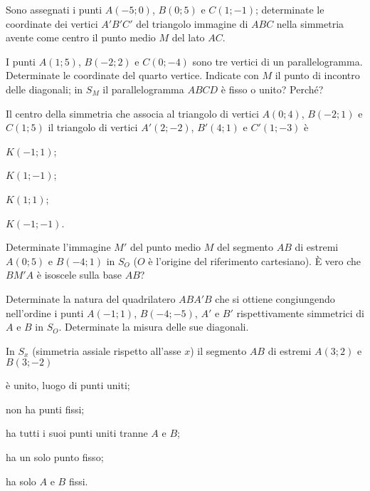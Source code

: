 \begin{esercizio}
  \label{ese:8.9}
  Sono assegnati i punti $A(-5;0)$, $B(0;5)$ e $C(1;-1)$; determinate 
  le coordinate dei vertici $A'B'C'$ del triangolo immagine di $ABC$ 
  nella simmetria avente come centro il punto medio $M$ del lato $AC$.
\end{esercizio}

\begin{esercizio}
  \label{ese:8.10}
  I punti $A(1;5)$, $B(-2;2)$ e $C(0;-4)$ sono tre vertici di un 
  parallelogramma. Determinate le coordinate del quarto vertice. 
  Indicate con $M$ il punto di incontro delle diagonali; in $S_M$ il 
  parallelogramma $ABCD$ è fisso o unito? Perché?
\end{esercizio}

\begin{esercizio}
  \label{ese:8.13}
  Il centro della simmetria che associa al triangolo di vertici 
  $A(0;4)$, $B(-2;1)$ e $C(1;5)$ il triangolo di vertici $A'(2;-2)$, 
  $B'(4;1)$ e $C'(1;-3)$ è
  \begin{multicols}{2}
    \begin{enumeratea}
      \item $K(-1;1)$;
      \item $K(1;-1)$;
      \item $K(1;1)$;
      \item $K(-1;-1)$.
    \end{enumeratea}
  \end{multicols}
\end{esercizio}

\begin{esercizio}
  \label{ese:8.14}
  Determinate l'immagine $M'$ del punto medio $M$ del segmento $AB$ di 
  estremi $A(0;5)$ e $B(-4;1)$ in $S_O$ ($O$ è l'origine del 
  riferimento cartesiano). \`E vero che $BM'A$ è isoscele sulla base 
  $AB$?
\end{esercizio}

\begin{esercizio}
  \label{ese:8.15}
  Determinate la natura del quadrilatero $ABA'B$ che si ottiene 
  congiungendo nell'ordine i punti $A(-1;1)$, $B(-4;-5)$, $A'$ e $B'$ 
  rispettivamente simmetrici di $A$ e $B$ in $S_O$. Determinate la 
  misura delle sue diagonali.
\end{esercizio}

\begin{esercizio}
  \label{ese:8.27}
  In $S_x$ (simmetria assiale rispetto all'asse $x$) il segmento $AB$ 
  di estremi $A(3;2)$ e $B(3;-2)$
  \begin{enumeratea}
    \item è unito, luogo di punti uniti;
    \item non ha punti fissi;
    \item ha tutti i suoi punti uniti tranne $A$ e $B$;
    \item ha un solo punto fisso;
    \item ha solo $A$ e $B$ fissi.
  \end{enumeratea}
\end{esercizio}

